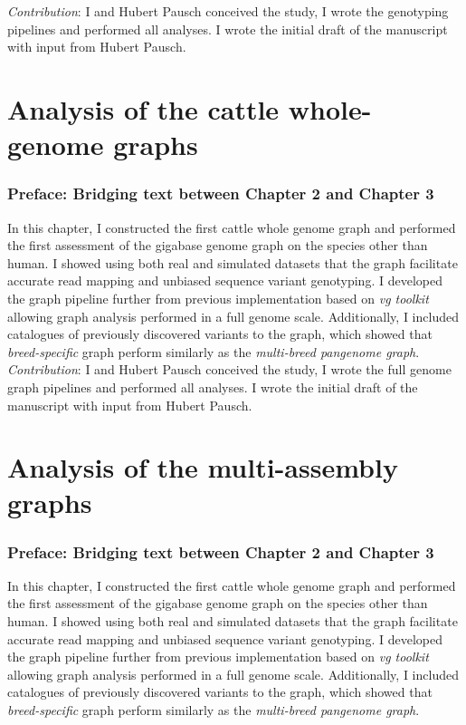 \documentclass[12 pt, a4paper, notitlepage]{report}
\begin{document}
\emph{Contribution}: I and Hubert Pausch conceived the study, I wrote the genotyping pipelines and performed all analyses. I wrote the initial draft of the manuscript with input from Hubert Pausch. 
\onehalfspacing



\chapter[Whole genome cattle graphs]{\Large{Analysis of the cattle whole-genome graphs}}
\label{chap:wholegraph}

\subsection*{Preface: Bridging text between Chapter 2 and Chapter 3}

In this chapter, I constructed the first cattle whole genome graph and performed the first assessment of the gigabase genome graph on the species other than human. I showed using both real and simulated datasets that the graph facilitate accurate read mapping and unbiased sequence variant genotyping. I developed the graph pipeline further from previous implementation based on \emph{vg toolkit} allowing graph analysis performed in a full genome scale. Additionally, I included catalogues of previously discovered variants to the graph, which showed that \emph{breed-specific} graph perform similarly as the \emph{multi-breed pangenome graph}. \\

\emph{Contribution}: I and Hubert Pausch conceived the study, I wrote the full genome graph pipelines and performed all analyses. I wrote the initial draft of the manuscript with input from Hubert Pausch. 

\onehalfspacing


\chapter[Multiassembly bovine graphs]{\Large{Analysis of the multi-assembly graphs}}
\label{chap:multigraph}

\subsection*{Preface: Bridging text between Chapter 2 and Chapter 3}

In this chapter, I constructed the first cattle whole genome graph and performed the first assessment of the gigabase genome graph on the species other than human. I showed using both real and simulated datasets that the graph facilitate accurate read mapping and unbiased sequence variant genotyping. I developed the graph pipeline further from previous implementation based on \emph{vg toolkit} allowing graph analysis performed in a full genome scale. Additionally, I included catalogues of previously discovered variants to the graph, which showed that \emph{breed-specific} graph perform similarly as the \emph{multi-breed pangenome graph}. \\
\end{document}

